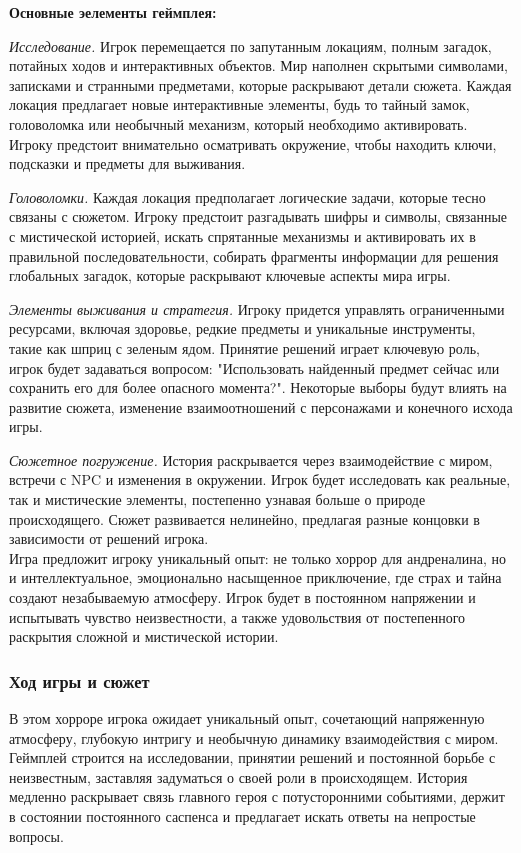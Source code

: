 \documentclass{article}
\begin{document}
	 \textbf{Основные эелементы геймплея:}
	 
	 \textit{Исследование.} Игрок перемещается по запутанным локациям, полным загадок, потайных ходов и интерактивных объектов. Мир наполнен скрытыми символами, записками и странными предметами, которые раскрывают детали сюжета. Каждая локация предлагает новые интерактивные элементы, будь то тайный замок, головоломка или необычный механизм, который необходимо активировать. Игроку предстоит внимательно осматривать окружение, чтобы находить ключи, подсказки и предметы для выживания.
	 
	 \textit{Головоломки.} Каждая локация предполагает логические задачи, которые тесно связаны с сюжетом. Игроку предстоит разгадывать шифры и символы, связанные с мистической историей, искать спрятанные механизмы и активировать их в правильной последовательности, собирать фрагменты информации для решения глобальных загадок, которые раскрывают ключевые аспекты мира игры.
	 
	 \textit{Элементы выживания и стратегия.}  Игроку придется управлять ограниченными ресурсами, включая здоровье,  редкие предметы и уникальные инструменты, такие как шприц с зеленым ядом. Принятие решений играет ключевую роль, игрок будет задаваться вопросом: "Использовать найденный предмет сейчас или сохранить его для более опасного момента?". Некоторые выборы будут влиять на развитие сюжета, изменение взаимоотношений с персонажами и конечного исхода игры.
	 
	 \textit{Сюжетное погружение.} История раскрывается через взаимодействие с миром, встречи с NPC и изменения в окружении. Игрок будет исследовать как реальные, так и мистические элементы, постепенно узнавая больше о природе происходящего. Сюжет развивается нелинейно, предлагая разные концовки в зависимости от решений игрока. \\
	 
	 Игра предложит игроку уникальный опыт: не только хоррор для андреналина, но и интеллектуальное, эмоционально насыщенное приключение, где страх и тайна создают незабываемую атмосферу. Игрок будет в постоянном напряжении и испытывать чувство неизвестности, а также удовольствия от постепенного раскрытия сложной и мистической истории. \\
	
	\subsubsection{Ход игры и сюжет}
		
	В этом хорроре игрока ожидает уникальный опыт, сочетающий напряженную атмосферу, глубокую интригу и необычную динамику взаимодействия с миром. Геймплей строится на исследовании, принятии решений и постоянной борьбе с неизвестным, заставляя задуматься о своей роли в происходящем. История медленно раскрывает связь главного героя с потусторонними событиями, держит в состоянии постоянного саспенса и предлагает искать ответы на непростые вопросы.
	
\end{document}
